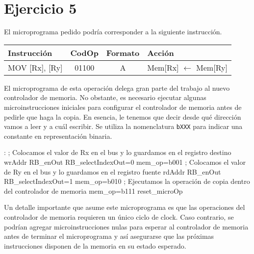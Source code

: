 \section{Ejercicio 5}

El microprograma pedido podría corresponder a la siguiente instrucción.

\begin{table}[ht]
\ttfamily
\begin{tabular}{|l|c|c|l|}
    Instrucción & CodOp & Formato & Acción \\
    \hline
    MOV [Rx], [Ry] & 01100 & A & Mem[Rx] $\gets$ Mem[Ry]
\end{tabular}
\end{table}

El microprograma de esta operación delega gran parte del trabajo al nuevo controlador de memoria. No obstante, es necesario ejecutar algunas microinstrucciones iniciales para configurar el controlador de memoria antes de pedirle que haga la copia. En esencia, le tenemos que decir desde qué dirección vamos a leer y a cuál escribir. Se utiliza la nomenclatura \lstinline{bXXX} para indicar una constante en representación binaria.

\begin{algorithm}[H]
\ttfamily
\begin{algorithmic}[1]
    : 
    \State \;\; {\color{gray}; Colocamos el valor de Rx en el bus y lo guardamos en el registro destino wrAddr}
    \State \;\; RB\_enOut RB\_selectIndexOut=0 mem\_op=b001
    \State \;\; {\color{gray}; Colocamos el valor de Ry en el bus y lo guardamos en el registro fuente rdAddr}
    \State \;\; RB\_enOut RB\_selectIndexOut=1 mem\_op=b010
    \State \;\; {\color{gray}; Ejecutamos la operación de copia dentro del controlador de memoria}
    \State \;\; mem\_op=b111
    \State \;\; reset\_microOp
\end{algorithmic}
\end{algorithm}

Un detalle importante que asume este microprograma es que las operaciones del controlador de memoria requieren un único ciclo de clock. Caso contrario, se podrían agregar microinstrucciones nulas para esperar al controlador de memoria antes de terminar el microprograma y así asegurarse que las próximas instrucciones disponen de la memoria en su estado esperado.
